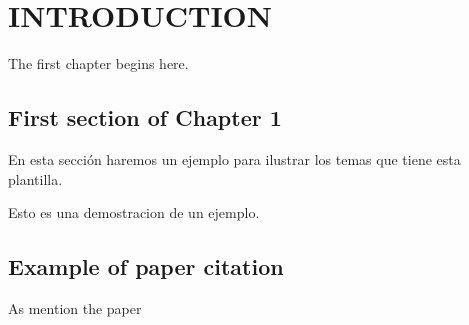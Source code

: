 ﻿%
\chapter{INTRODUCTION}  %

The first chapter begins here.

\section{First section of Chapter 1}

En esta secci\'on haremos un ejemplo para ilustrar los temas que tiene esta plantilla.

\begin{example}
Esto es una demostracion de un ejemplo.
\end{example}

\section{Example of paper citation}

As mention the paper \cite{Cohen85} 
